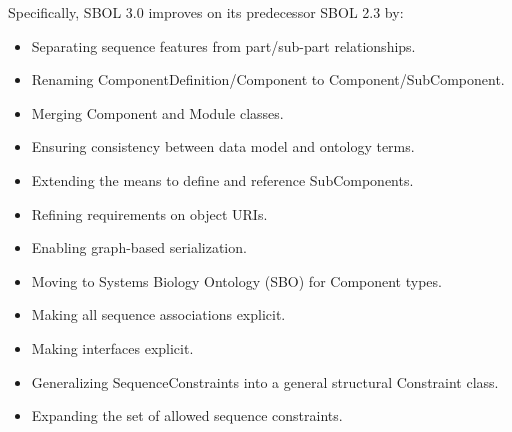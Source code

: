 Specifically, SBOL 3.0 improves on its predecessor SBOL 2.3 by:
\begin{itemize}
\item Separating sequence features from part/sub-part relationships.
\item Renaming ComponentDefinition/Component to Component/SubComponent.
\item Merging Component and Module classes.
\item Ensuring consistency between data model and ontology terms.
\item Extending the means to define and reference SubComponents.
\item Refining requirements on object URIs.
\item Enabling graph-based serialization.
\item Moving to Systems Biology Ontology (SBO) for Component types.
\item Making all sequence associations explicit.
\item Making interfaces explicit.
\item Generalizing SequenceConstraints into a general structural Constraint class.
\item Expanding the set of allowed sequence constraints.
\end{itemize}
